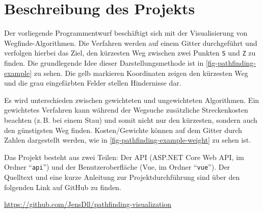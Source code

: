 \part{Beschreibung des Projekts}
Der vorliegende Programmentwurf beschäftigt sich mit der
Visualisierung von Wegfinde-Algo\-rithmen.
Die Verfahren werden auf einem Gitter durchgeführt und
verfolgen hierbei das Ziel, den kürzesten Weg zwischen zwei Punkten
\texttt{S} und \texttt{Z} zu finden.
Die grundlegende Idee dieser Darstellungsmethode ist in
\autoref{fig-pathfinding-example} zu sehen.
Die gelb markieren Koordinaten zeigen den kürzesten Weg und die
grau eingefärbten Felder stellen Hindernisse dar.



\noindent
Es wird unterschieden zwischen gewichteten und ungewichteten
Algorithmen. Ein gewichtetes Verfahren kann während der Wegsuche zusätzliche
Streckenkosten beachten (z.\,B. bei einem Stau)
und somit nicht nur den kürzesten, sondern
auch den günstigsten Weg finden. Kosten/Gewichte können auf dem Gitter durch
Zahlen dargestellt werden, wie in \autoref{fig-pathfinding-example-weight}
zu sehen ist.



\noindent
Das Projekt besteht aus zwei Teilen: Der API
(ASP.NET Core Web API, im Ordner \enquote{\texttt{api}}) und der Benutzeroberfläche
(Vue, im Ordner \enquote{\texttt{vue}}). Der Quelltext
und eine kurze Anleitung zur Projektdurchführung sind über den folgenden Link auf GitHub zu finden.
\begin{center}
  \url{https://github.com/JensDll/pathfinding-visualization}
\end{center}
